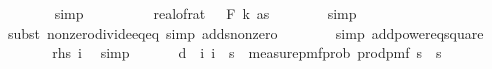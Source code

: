 \begin{isabellebody}
\ \ \ \ \ \ \isamarkupfalse%
\ simp\isanewline
\ \ \ \ \isamarkupfalse%
\ \isamarkupfalse%
\ {\isachardoublequoteopen}{\isachardot}{\kern0pt}{\isachardot}{\kern0pt}{\isachardot}{\kern0pt}\ {\isacharequal}{\kern0pt}\ real{\isacharunderscore}{\kern0pt}of{\isacharunderscore}{\kern0pt}rat\ {\isacharparenleft}{\kern0pt}{\isasymdelta}\ {\isacharasterisk}{\kern0pt}\ F\ k\ as{\isacharparenright}{\kern0pt}{\isacharcircum}{\kern0pt}{}{\isacharslash}{\kern0pt}{}{\isachardoublequoteclose}\isanewline
\ \ \ \ \ \ \isamarkupfalse%
\ simp\isanewline
\ \ \ \ \ \ \isamarkupfalse%
\ {\isacharparenleft}{\kern0pt}subst\ nonzero{\isacharunderscore}{\kern0pt}divide{\isacharunderscore}{\kern0pt}eq{\isacharunderscore}{\kern0pt}eq{\isacharcomma}{\kern0pt}\ simp\ add{\isacharcolon}{\kern0pt}s{}{\isacharunderscore}{\kern0pt}nonzero{\isacharparenright}{\kern0pt}\isanewline
\ \ \ \ \ \ \isamarkupfalse%
\ {\isacharparenleft}{\kern0pt}simp\ add{\isacharcolon}{\kern0pt}power{}{\isacharunderscore}{\kern0pt}eq{\isacharunderscore}{\kern0pt}square{\isacharparenright}{\kern0pt}\ \isanewline
\ \ \ \ \isamarkupfalse%
\ \isamarkupfalse%
\ {\isachardoublequoteopen}{\isacharquery}{\kern0pt}rhs\ i{\isachardoublequoteclose}\ \isamarkupfalse%
\ simp\isanewline
\ \ \isamarkupfalse%
\isanewline
\isanewline
\ \ \isamarkupfalse%
\ d{\isacharcolon}{\kern0pt}\ {\isachardoublequoteopen}\ {\isasymAnd}i{\isachardot}{\kern0pt}\ i\ {\isacharless}{\kern0pt}\ s\ {\isasymLongrightarrow}\ measure{\isacharunderscore}{\kern0pt}pmf{\isachardot}{\kern0pt}prob\ {\isacharparenleft}{\kern0pt}prod{\isacharunderscore}{\kern0pt}pmf\ {\isacharparenleft}{\kern0pt}{\isacharbraceleft}{\kern0pt}{}{\isachardot}{\kern0pt}{\isachardot}{\kern0pt}{\isacharless}{\kern0pt}s\ {\isasymtimes}\ {\isacharbraceleft}{\kern0pt}{}{\isachardot}{\kern0pt}{\isachardot}{\kern0pt}{\isacharless}{\kern0pt}s\ {\isacharparenleft}{\kern0pt}{\isasymlambda}{\isacharunderscore}{\kern0pt}{\isachardot}{\kern0pt}\ {\isasymOmega}{\isacharparenright}{\kern0pt}{\isacharparenright}{\kern0pt}\ \isanewline

\end{isabellebody}
